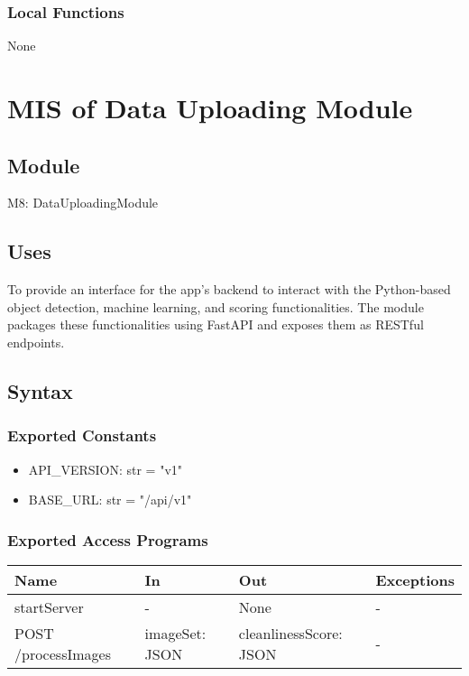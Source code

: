 \documentclass[12pt, titlepage]{article}
\begin{document}
\subsubsection{Local Functions}
None

\newpage

\section{MIS of Data Uploading Module} \label{Module} 

\subsection{Module}

M8: DataUploadingModule

\subsection{Uses}
To provide an interface for the app's backend to interact with the Python-based object detection, machine learning, and scoring functionalities. The module packages these functionalities using FastAPI and exposes them as RESTful endpoints.

\subsection{Syntax}

\subsubsection{Exported Constants}

\begin{itemize}
  \item API{\_}VERSION: str = "v1"
  \item BASE{\_}URL: str = "/api/v1"
\end{itemize}

\subsubsection{Exported Access Programs}

\begin{center}
\begin{tabular}{p{5cm} p{4cm} p{4cm} p{2cm}}
\hline
\textbf{Name} & \textbf{In} & \textbf{Out} & \textbf{Exceptions} \\
\hline
startServer & - & None & - \\
POST /processImages & imageSet: JSON & cleanlinessScore: JSON & - \\
\hline
\end{tabular}
\end{center}
\end{document}
